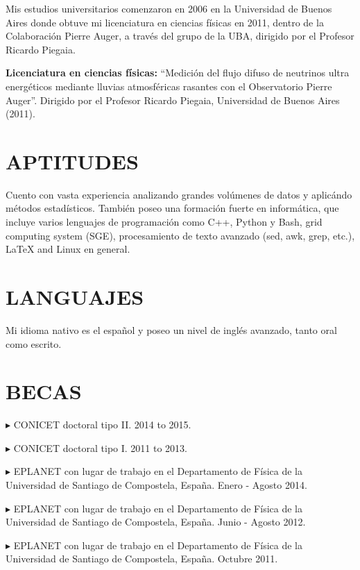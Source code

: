 \documentclass[letterpaper]{article}
\renewenvironment{itemize}{
  \begin{list}{}{
    \setlength{\leftmargin}{1.5em}
  }
}{
  \end{list}
}
\begin{document}
Mis estudios universitarios comenzaron en 2006 en la Universidad de Buenos Aires donde obtuve mi licenciatura en ciencias físicas en 2011, dentro de la Colaboración Pierre Auger, a través del grupo de la UBA, dirigido por el Profesor Ricardo Piegaia.

\begin{itemize}
 \item \textbf{Licenciatura en ciencias físicas:} ``Medición del flujo difuso de neutrinos ultra energéticos mediante lluvias atmosféricas rasantes con el Observatorio Pierre Auger''.
 Dirigido por el Profesor Ricardo Piegaia, Universidad de Buenos Aires (2011).
\end{itemize}
 
\section*{APTITUDES}


Cuento con vasta experiencia analizando grandes volúmenes de datos y aplicándo métodos estadísticos. También poseo una formación fuerte en informática, que incluye varios lenguajes de programación como C++, Python y Bash, grid computing system (SGE), procesamiento de texto avanzado (sed, awk, grep, etc.), \LaTeX{} and Linux en general.


\section*{LANGUAJES}

Mi idioma nativo es el español y poseo un nivel de inglés avanzado, tanto oral como escrito.


\section*{BECAS} 
   \begin{itemize} %
   \item $\blacktriangleright$ CONICET doctoral tipo II. 2014 to 2015. 
   \item $\blacktriangleright$ CONICET doctoral tipo I. 2011 to 2013. 
   \item $\blacktriangleright$ EPLANET con lugar de trabajo en el Departamento de Física de la Universidad de Santiago de Compostela, España. Enero - Agosto 2014.
   \item $\blacktriangleright$ EPLANET con lugar de trabajo en el Departamento de Física de la Universidad de Santiago de Compostela, España. Junio - Agosto 2012.
   \item $\blacktriangleright$ EPLANET con lugar de trabajo en el Departamento de Física de la Universidad de Santiago de Compostela, España. Octubre 2011.
 \end{itemize}
\end{document}
